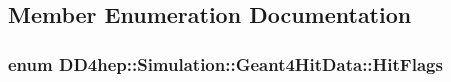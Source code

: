 \subsection{Member Enumeration Documentation}
\hypertarget{class_d_d4hep_1_1_simulation_1_1_geant4_hit_data_a2ae584db022f0919214459dffcaf41fc}{
\subsubsection[{HitFlags}]{\setlength{\rightskip}{0pt plus 5cm}enum {\bf DD4hep::Simulation::Geant4HitData::HitFlags}}}
\label{class_d_d4hep_1_1_simulation_1_1_geant4_hit_data_a2ae584db022f0919214459dffcaf41fc}
